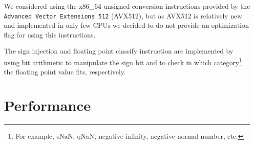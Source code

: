 \documentclass[course=eragp]{aspdoc}
\begin{document}
\par

We considered using the x86\_64 unsigned conversion instructions provided by the \texttt{Advanced
    Vector Extensions 512} (AVX512), but as AVX512 is relatively new and implemented in only few CPUs we
decided to do not provide an optimization flag for using this instructions.

\par

The sign injection and floating point classify instruction are implemented by using bit arithmetic
to manipulate the sign bit and to check in which category\footnote{For example, sNaN, qNaN, negative
    infinity, negative normal number, etc.} the floating point value fits, respectively.

\section{Performance}\label{sec:evaluation}
\end{document}
